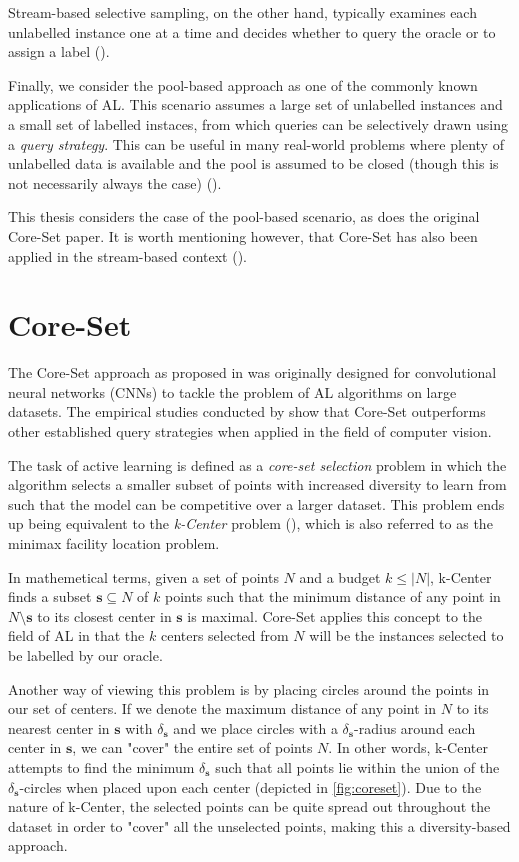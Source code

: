 \documentclass[english,bachelor,ul]{webisthesis} %
\begin{document}
Stream-based selective sampling, on the other hand, typically examines each unlabelled instance one at a time and decides whether to query the oracle or to assign a label (\cite{settles.tr09}).

Finally, we consider the pool-based approach as one of the commonly known applications of AL. This scenario assumes a large set of unlabelled instances and a small set of labelled instaces, from which queries can be selectively drawn using a \textit{query strategy}. This can be useful in many real-world problems where plenty of unlabelled data is available and the pool is assumed to be closed (though this is not necessarily always the case) (\cite{settles.tr09}).

This thesis considers the case of the pool-based scenario, as does the original Core-Set paper. It is worth mentioning however, that Core-Set has also been applied in the stream-based context (\cite{DBLP:conf/icml/SaranYK0A23}).

\section{Core-Set}


The Core-Set approach as proposed in \cite{DBLP:conf/iclr/SenerS18} was originally designed for convolutional neural networks (CNNs) to tackle the problem of AL algorithms on large datasets. The empirical studies conducted by \cite{DBLP:conf/iclr/SenerS18} show that Core-Set outperforms other established query strategies when applied in the field of computer vision.

The task of active learning is defined as a \textit{core-set selection} problem in which the algorithm selects a smaller subset of points with increased diversity to learn from such that the model can be competitive over a larger dataset. This problem ends up being equivalent to the \textit{k-Center} problem (\cite{DBLP:conf/iclr/SenerS18}), which is also referred to as the minimax facility location problem. 

In mathemetical terms, given a set of points $ N $ and a budget $ k \leq |N| $, k-Center finds a subset $ \mathbf{s} \subseteq N $ of $ k $ points such that the minimum distance of any point in $ N \setminus \mathbf{s} $ to its closest center in $ \mathbf{s} $ is maximal. Core-Set applies this concept to the field of AL in that the $ k $ centers selected from $ N $ will be the instances selected to be labelled by our oracle.

Another way of viewing this problem is by placing circles around the points in our set of centers. If we denote the maximum distance of any point in $ N $ to its nearest center in $ \mathbf{s} $ with $ \delta_{\mathbf{s}} $ and we place circles with a $ \delta_{\mathbf{s}} $-radius around each center in $ \mathbf{s} $, we can "cover" the entire set of points $ N $. In other words, k-Center attempts to find the minimum $ \delta_{\mathbf{s}} $ such that all points lie within the union of the $ \delta_{\mathbf{s}} $-circles when placed upon each center (depicted in \ref{fig:coreset}). Due to the nature of k-Center, the selected points can be quite spread out throughout the dataset in order to "cover" all the unselected points, making this a diversity-based approach. 
\end{document}

